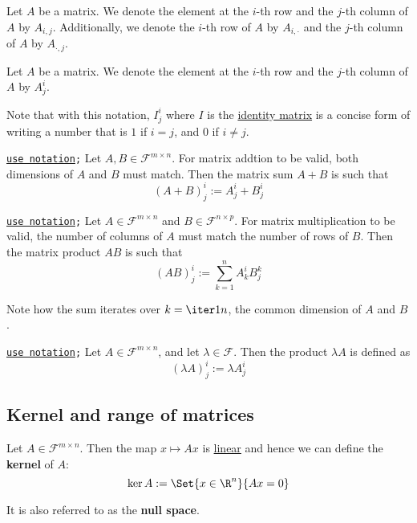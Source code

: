 \label{d76dfe6}

Let $A$ be a matrix. We denote the element at the $i$-th row and the $j$-th
column of $A$ by $A_{i,j}$. Additionally, we denote the $i$-th row of $A$ by
$A_{i,\cdot}$ and the $j$-th column of $A$ by $A_{\cdot,j}$.

\label{beaa574}

Let $A$ be a matrix. We denote the element at the $i$-th row and the $j$-th
column of $A$ by $A^i_j$.

Note that with this notation, $I^i_j$ where $I$ is the \href{dcfd9cd}{identity
matrix} is a concise form of writing a number that is $1$ if $i=j$, and $0$ if
$i\neq j$.

\label{e41b441}

\texttt{\href{beaa574}{use notation};} Let $A,B\in\mathcal F^{m\times n}$. For
matrix addtion to be valid, both dimensions of $A$ and $B$ must match. Then the
matrix sum $A+B$ is such that
$$
  (A+B)^i_j:=A^i_j+B^i_j
$$

\label{d786633}

\texttt{\href{beaa574}{use notation};} Let $A\in\mathcal F^{m\times n}$ and
$B\in\mathcal F^{n\times p}$. For matrix multiplication to be valid, the number
of columns of $A$ must match the number of rows of $B$. Then the matrix product
$AB$ is such that
$$
  (AB)^i_j:=\sum_{k=1}^nA^i_kB^k_j
$$

Note how the sum iterates over $k=\iter1n$, the common dimension of $A$ and
$B$.

\label{d36252c}

\texttt{\href{beaa574}{use notation};} Let $A\in\mathcal F^{m\times n}$, and let
$\lambda\in\mathcal F$. Then the product $\lambda A$ is defined as
$$
  (\lambda A)^i_j:=\lambda A^i_j
$$

\subsection{Kernel and range of matrices}\label{ad763e5}

\label{d6bf553}

Let $A\in\mathcal F^{m\times n}$. Then the map $x\mapsto Ax$ is
\href{d7d1925}{linear} and hence we can define the \textbf{kernel} of $A$:
$$
  \ker A:=\Set{x\in\R^n}{Ax=0}
$$

It is also referred to as the \textbf{null space}.

